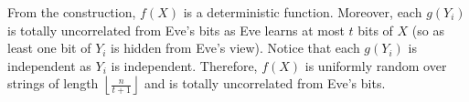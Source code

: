 \documentclass[12pt]{article}
\begin{document}
\begin{enumerate}
\begin{enumerate}
From the construction, $f(X)$ is a deterministic function. Moreover, each $g(Y_i)$ is totally uncorrelated from Eve's bits as Eve learns at most $t$ bits of $X$ (so as least one bit of $Y_i$ is hidden from Eve's view). Notice that each $g(Y_i)$ is independent as $Y_i$ is independent. Therefore, $f(X)$ is uniformly random over strings of length $\left\lfloor\frac n{t+1}\right\rfloor$ and is totally uncorrelated from Eve's bits.
\end{enumerate}

\end{enumerate}
\end{document}
